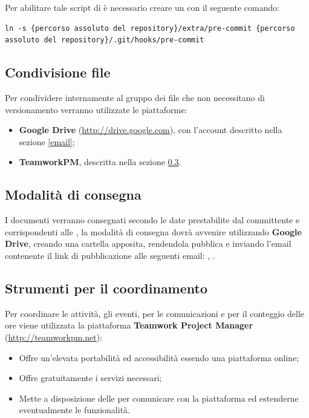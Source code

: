 Per abilitare tale script di  è necessario creare un  con il seguente comando:
\begin{lstlisting}
ln -s {percorso assoluto del repository}/extra/pre-commit {percorso assoluto del repository}/.git/hooks/pre-commit
\end{lstlisting}

\subsection{Condivisione file}

Per condividere internamente al gruppo dei file che non necessitano di versionamento verranno utilizzate le piattaforme:
\begin{itemize}
 \item \textbf{Google Drive} (\url{http://drive.google.com}), con l'account descritto nella sezione \ref{email};
 \item \textbf{TeamworkPM}, descritta nella sezione \ref{teamworkpm}.
\end{itemize}

\subsection{Modalità di consegna}
I documenti verranno consegnati secondo le date prestabilite dal committente e corrispondenti alle , la modalità di consegna dovrà avvenire utilizzando \textbf{Google Drive}, creando una cartella apposita, rendendola pubblica e inviando l'email contenente il link di pubblicazione alle seguenti email: , .

	\subsection{Strumenti per il coordinamento}
	\label{teamworkpm}
	
		Per coordinare le attività, gli eventi, per le comunicazioni e per il conteggio delle ore viene utilizzata la piattaforma \textbf{Teamwork Project Manager} (\url{http://teamworkpm.net}):
		\begin{itemize}
			\item Offre un'elevata portabilità ed accessibilità essendo una piattaforma online;
			\item Offre gratuitamente i servizi necessari;
			\item Mette a disposizione delle  per comunicare con la piattaforma ed estenderne eventualmente le funzionalità.
		\end{itemize}
		
